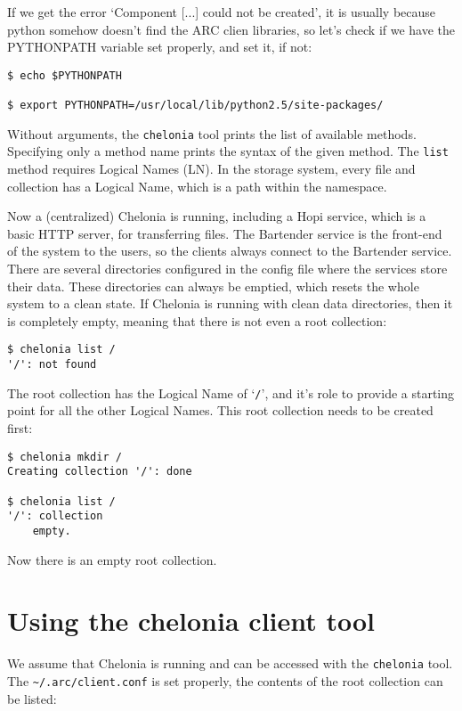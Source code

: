 \documentclass{article}
\begin{document}
If we get the error `Component [...] could not be created', it is usually because python somehow doesn't find the ARC clien libraries, so let's check if we have the PYTHONPATH  variable set properly, and set it, if not:

\begin{verbatim}
$ echo $PYTHONPATH

$ export PYTHONPATH=/usr/local/lib/python2.5/site-packages/
\end{verbatim}

Without arguments, the \verb!chelonia! tool prints the list of available methods. Specifying only a method name prints the syntax of the given method. The \verb!list! method requires Logical Names (LN). In the storage system, every file and collection has a Logical Name, which is a path within the namespace.

Now a (centralized) Chelonia is running, including a Hopi service, which is a basic HTTP server, for transferring files. The Bartender service is the front-end of the system to the users, so the clients always connect to the Bartender service. There are several directories configured in the config file where the services store their data. These directories can always be emptied, which resets the whole system to a clean state. If Chelonia is running with clean data directories, then it is completely empty, meaning that there is not even a root collection:

\begin{verbatim}
$ chelonia list /
'/': not found
\end{verbatim}

The root collection has the Logical Name of `\verb!/!', and it's role to provide a starting point for all the other Logical Names. This root collection needs to be created first:

\begin{verbatim}
$ chelonia mkdir /
Creating collection '/': done

$ chelonia list /
'/': collection
    empty.
\end{verbatim}

Now there is an empty root collection.

\section{Using the chelonia client tool} %

We assume that Chelonia is running and can be accessed with the \verb!chelonia! tool. The \verb!~/.arc/client.conf! is set properly, the contents of the root collection can be listed:
\end{document}
